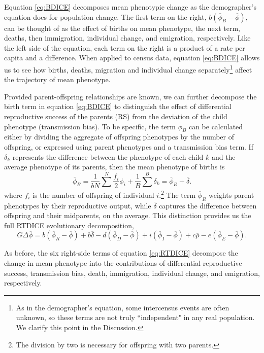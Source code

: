 \documentclass[11pt]{article}
\begin{document}
Equation \ref{eq:BDICE} decomposes mean phenotypic change as the demographer's equation does for population change.  The first term on the right, $b(\overline{\phi}_B - \overline{\phi})$, can be thought of as the effect of births on mean phenotype, the next term, deaths, then immigration, individual change, and emigration, respectively.  Like the left side of the equation, each term on the right is a product of a rate per capita and a difference.  When applied to census data, equation \ref{eq:BDICE} allows us to see how births, deaths, migration and individual change separately\footnote{As in the demographer's equation, some intercensus events are often unknown, so these terms are not truly ``independent" in any real population. We clarify this point in the Discussion.} affect the trajectory of mean phenotype.  

Provided parent-offspring relationships are known, we can further decompose the birth term in equation \ref{eq:BDICE} to distinguish the effect of differential reproductive success of the parents (RS) from the deviation of the child phenotype (transmission bias).  To be specific, the term $\overline{\phi}_B$ can be calculated either by dividing the aggregate of offspring phenotypes by the number of offspring, or expressed using parent phenotypes and a transmission bias term.  If $\delta_k$ represents the difference between the phenotype of each child $k$ and the average phenotype of its parents, then the mean phenotype of births is
	\[\overline{\phi}_B = \frac{1}{bN} \sum^N \frac{f_i}{2} \phi_i + \frac{1}{B} \sum^B \delta_k = \overline{\phi}_{R} + \overline{\delta}.
\]
where $f_i$ is the number of offspring of individual $i$.\footnote{The division by two is necessary for offspring with two parents.}  The term $\overline{\phi}_{R}$ weights parent phenotypes by their reproductive output, while $\overline{\delta}$ captures the difference between offspring and their midparents, on the average.  This distinction provides us the full RTDICE evolutionary decomposition,
\begin{equation}  \label{eq:RTDICE}
G\Delta \overline{\phi} = b(\overline{\phi}_{R} - \overline{\phi}) + b \overline{\delta} - d(\overline{\phi}_D - \overline{\phi}) + i(\overline{\phi}_I - \overline{\phi}) + c \overline{\rho} - e(\overline{\phi}_E - \overline{\phi}).
\end{equation}

As before, the six right-side terms of equation \ref{eq:RTDICE} decompose the change in mean phenotype into the contributions of differential reproductive success, transmission bias, death, immigration, individual change, and emigration, respectively. 
\end{document}
